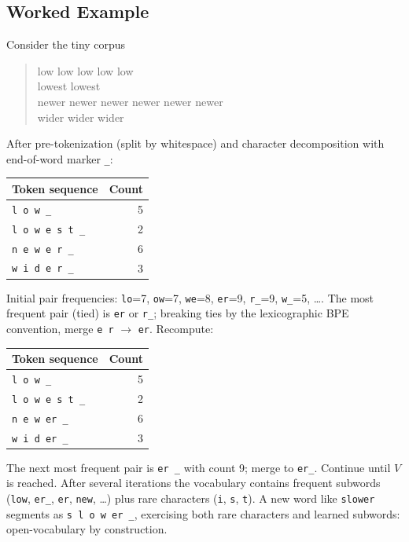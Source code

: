 \subsection{Worked Example}

Consider the tiny corpus
\begin{quote}\ttfamily
low low low low low\\
lowest lowest\\
newer newer newer newer newer newer\\
wider wider wider
\end{quote}
After pre-tokenization (split by whitespace) and character
decomposition with end-of-word marker \texttt{\_}:

\begin{center}
\begin{tabular}{|l|r|}
\hline
Token sequence & Count \\
\hline
\texttt{l o w \_}                  & 5 \\
\texttt{l o w e s t \_}            & 2 \\
\texttt{n e w e r \_}              & 6 \\
\texttt{w i d e r \_}              & 3 \\
\hline
\end{tabular}
\end{center}

Initial pair frequencies:
\texttt{lo}=7,
\texttt{ow}=7,
\texttt{we}=8,
\texttt{er}=9,
\texttt{r\_}=9,
\texttt{w\_}=5, \ldots.
The most frequent pair (tied) is \texttt{er} or \texttt{r\_}; breaking
ties by the lexicographic BPE convention, merge \texttt{e r}
$\to$ \texttt{er}. Recompute:

\begin{center}
\begin{tabular}{|l|r|}
\hline
Token sequence & Count \\
\hline
\texttt{l o w \_}                  & 5 \\
\texttt{l o w e s t \_}            & 2 \\
\texttt{n e w er \_}               & 6 \\
\texttt{w i d er \_}               & 3 \\
\hline
\end{tabular}
\end{center}

The next most frequent pair is \texttt{er \_} with count 9; merge to
\texttt{er\_}. Continue until $V$ is reached. After several iterations
the vocabulary contains frequent subwords (\texttt{low}, \texttt{er\_},
\texttt{er}, \texttt{new}, \ldots) plus rare characters (\texttt{i},
\texttt{s}, \texttt{t}). A new word like \texttt{slower} segments as
\texttt{s l o w er \_}, exercising both rare characters and learned
subwords: open-vocabulary by construction.

